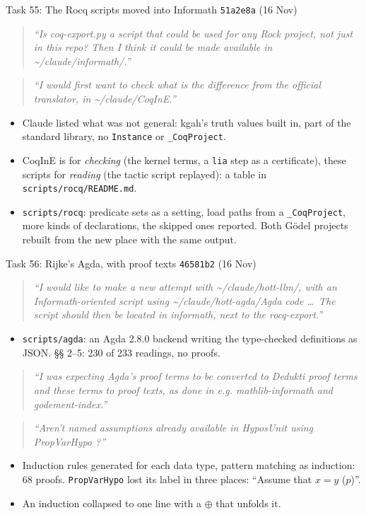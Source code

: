 \documentclass[10pt,aspectratio=169]{beamer}
\newcommand{\bad}[1]{\textcolor{warn}{#1}}
\newcommand{\ok}[1]{\textcolor{good}{#1}}
\newcommand{\commit}[1]{\texttt{\footnotesize #1}}
\newcommand{\prompt}[1]{\begin{quote}\small\itshape ``#1''\end{quote}}
\begin{document}
\begin{frame}{Task 55: The Rocq scripts moved into Informath}
  \commit{51a2e8a} (16 Nov)
  \prompt{Is coq-export.py a script that could be used for any Rock project, not just in this repo?
  Then I think it could be made available in \textasciitilde/claude/informath/.}
  \prompt{I would first want to check what is the difference from the official translator, in
  \textasciitilde/claude/CoqInE.}
  \begin{itemize}\small
    \item Claude listed what was not general: kgah's truth values built in, part of the standard
          library, no \texttt{Instance} or \texttt{\_CoqProject}.
    \item CoqInE is for \emph{checking} (the kernel terms, a \texttt{lia} step as a certificate),
          these scripts for \emph{reading} (the tactic script replayed): a table in
          \texttt{scripts/rocq/README.md}.
    \item \texttt{scripts/rocq}: predicate sets as a setting, load paths from a
          \texttt{\_CoqProject}, more kinds of declarations, the skipped ones reported. Both
          Gödel projects rebuilt from the new place \ok{with the same output}.
  \end{itemize}
\end{frame}

\begin{frame}{Task 56: Rijke's Agda, with proof texts}
  \commit{46581b2} (16 Nov)
  \prompt{I would like to make a new attempt with \textasciitilde/claude/hott-llm/, with an
  Informath-oriented script using \textasciitilde/claude/hott-agda/Agda code \ldots\ The script
  should then be located in informath, next to the rocq-export.}
  \begin{itemize}\small
    \item \texttt{scripts/agda}: an Agda 2.8.0 backend writing the type-checked definitions as JSON.
          §§ 2--5: 230 of 233 readings, \bad{no proofs}.
  \end{itemize}
  \prompt{I was expecting Agda's proof terms to be converted to Dedukti proof terms and these terms
  to proof texts, as done in e.g. mathlib-informath and godement-index.}
  \prompt{Aren't named assumptions already available in HyposUnit using PropVarHypo ?}
  \begin{itemize}\small
    \item Induction rules generated for each data type, pattern matching as induction: 68 proofs.
          \texttt{PropVarHypo} lost its label in three places: \ok{``Assume that $x = y$ ($p$)''}.
    \item An induction collapsed to one line with a $\oplus$ that unfolds it.
  \end{itemize}
\end{frame}
\end{document}
